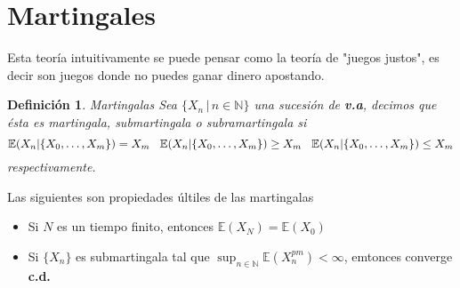 \documentclass[letterpaper]{article}
\newtheorem{def.}{Definici\'on}[section]
\newcommand{\nat}{\ensuremath{ \mathbb N }}
\newcommand{\esp}{\mathbb E}
\begin{document}
\section{Martingales}
\label{sec:org0f47b86}
\noindent Esta teoría intuitivamente se puede pensar como la teoría de "juegos justos", es decir son juegos donde no puedes ganar dinero apostando.
\begin{def.}{Martingalas}
Sea \(\{X_n\,\vert\,n\in\nat\}\) una sucesión de \textbf{v.a}, decimos que ésta es \emph{martingala, submartingala o subramartingala} si
\[
    \esp(X_n|\{X_0,\dots,X_m\})=X_m\hspace{0.3cm}\esp(X_n|\{X_0,\dots,X_m\})\geq X_m\hspace{0.3cm}\esp(X_n|\{X_0,\dots,X_m\})\leq X_m
\]
respectivamente.
\end{def.}
\noindent Las siguientes son propiedades últiles de las martingalas

\begin{itemize}
\item Si \(N\) es un tiempo finito, entonces \(\esp(X_N)=\esp(X_0)\)
\item Si \(\{X_n\}\) es submartingala tal que \(\sup_{n\in\nat}\esp(X^{pm}_n)<\infty\), emtonces converge \textbf{c.d.}
\end{itemize}
\end{document}
